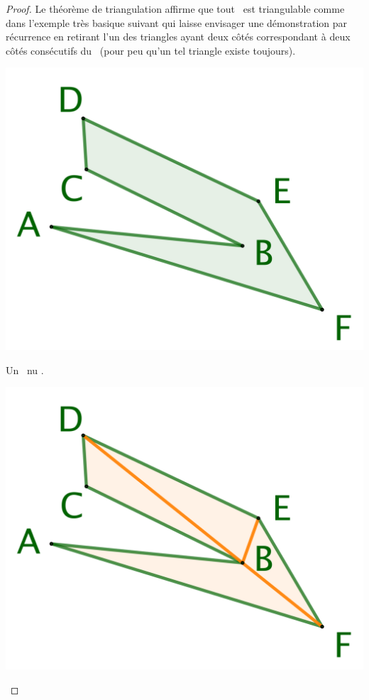 \begin{proof}
	Le théorème de triangulation affirme que tout \ngone\ est triangulable comme dans l'exemple très basique suivant qui laisse envisager une démonstration par récurrence en retirant l'un des triangles ayant deux côtés correspondant à deux côtés consécutifs du \ngone\ (pour peu qu'un tel triangle existe toujours).


    \begin{multicols}{3}
        \small\itshape
        \begin{center}
            \includegraphics[scale=.4]{content/polygon/geo-area/triangulation-1.png}

            \smallskip
            Un \ngone\ \og nu \fg.
        \end{center}


        \begin{center}
            \includegraphics[scale=.4]{content/polygon/geo-area/triangulation-2.png}


\end{center}
\end{multicols}
\end{proof}
